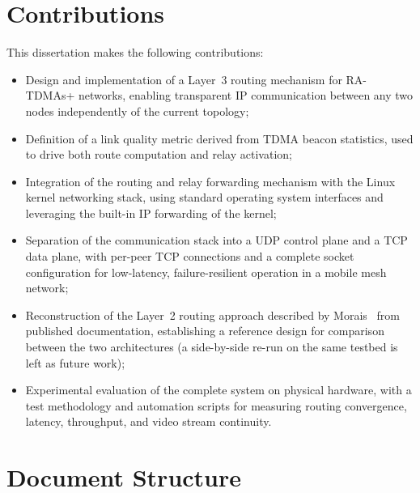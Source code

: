 \section{Contributions}
\label{sec:contributions}

This dissertation makes the following contributions:

\begin{itemize}

    \item Design and implementation of a Layer~3 routing mechanism for
    RA-TDMAs+ networks, enabling transparent IP communication between any
    two nodes independently of the current topology;

    \item Definition of a link quality metric derived from TDMA beacon
    statistics, used to drive both route computation and relay activation;

    \item Integration of the routing and relay forwarding mechanism with
    the Linux kernel networking stack, using standard operating system
    interfaces and leveraging the built-in IP forwarding of the kernel;

    \item Separation of the communication stack into a UDP control plane and
    a TCP data plane, with per-peer TCP connections and a complete socket
    configuration for low-latency, failure-resilient operation in a mobile
    mesh network;

    \item Reconstruction of the Layer~2 routing approach described by
    Morais~\cite{morais2024synchronization} from published documentation,
    establishing a reference design for comparison between the two
    architectures (a side-by-side re-run on the same testbed is left as
    future work);

    \item Experimental evaluation of the complete system on physical
    hardware, with a test methodology and automation scripts for measuring
    routing convergence, latency, throughput, and video stream continuity.

\end{itemize}

\section{Document Structure}
\label{sec:structure}

